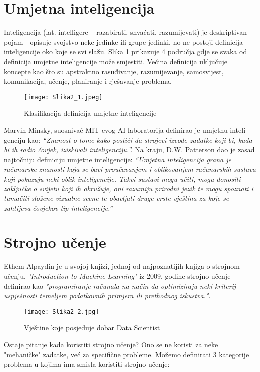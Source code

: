 \documentclass[seminar, utf8, numeric]{fer}
\begin{document}
\section{Umjetna inteligencija}
Inteligencija (lat. intelligere – razabirati, shvaćati, razumijevati) je deskriptivan pojam - opisuje svojstvo neke jedinke ili grupe jedinki, no ne postoji definicija inteligencije oko koje se svi slažu. Slika \ref{fig:slika2_1} prikazuje 4 područja gdje se svaka od definicija umjetne inteligencije može smjestiti. Većina definicija uključuje koncepte kao što su apstraktno rasuđivanje, razumijevanje, samosvijest, komunikacija, učenje, planiranje i rješavanje problema.

\begin{figure}[htp]
\centering
\texttt{[image: Slika2\_1.jpeg]}
\caption{Klasifikacija definicija umjetne inteligencije}
\label{fig:slika2_1}
\end{figure}

Marvin Minsky, suosnivač MIT-evog AI laboratorija definirao je umjetnu inteli-
genciju kao: \textit{“Znanost o tome kako postići da strojevi izvode zadatke koji bi, kada bi ih radio čovjek, iziskivali inteligenciju.”.}
Na kraju, D.W. Patterson dao je zasad najtočniju definiciju umjetne inteligencije: \textit{“Umjetna inteligencija grana je računarske znanosti koja se bavi proučavanjem i oblikovanjem računarskih sustava koji pokazuju neki oblik inteligencije. Takvi sustavi mogu učiti, mogu donositi zaključke o svijetu koji ih okružuje, oni razumiju prirodni jezik te mogu spoznati i tumačiti složene vizualne scene te obavljati druge vrste vještina za koje se zahtijeva čovjekov tip inteligencije.”}

\section{Strojno učenje}
Ethem Alpaydin je u svojoj knjizi, jednoj od najpoznatijih knjiga o strojnom učenju, \textit{"Introduction to Machine Learning"} iz 2009. godine strojno učenje definirao kao \textit{"programiranje računala na način da optimiziraju neki kriterij uspješnosti temeljem podatkovnih primjera ili prethodnog iskustva."}.

\begin{figure}[htp]
\centering
\texttt{[image: Slika2\_2.jpg]}
\caption{Vještine koje posjeduje dobar Data Scientist}
\label{fig:slika2_2}
\end{figure}

\newpage
Ostaje pitanje kada koristiti strojno učenje? Ono se ne koristi za neke "mehaničke" zadatke, već za specifične probleme. Možemo definirati 3 kategorije problema u kojima ima smisla koristiti strojno učenje:
\end{document}
